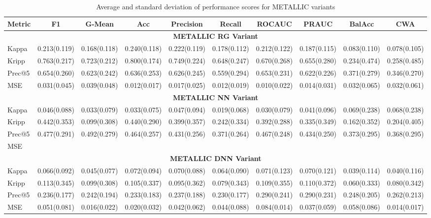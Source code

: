 \documentclass{article}
\begin{document}
\begin{sidewaystable}[htbp]
\centering
\caption{Average and standard deviation of performance scores for METALLIC variants}\label{tab:meanscores}
\small
\begin{tabular}{@{}lccccccccc@{}}
\toprule
\textbf{Metric} & \textbf{F1} & \textbf{G-Mean} & \textbf{Acc} & \textbf{Precision} & \textbf{Recall} & \textbf{ROCAUC} & \textbf{PRAUC} & \textbf{BalAcc} & \textbf{CWA} \\
\midrule
\multicolumn{10}{c}{\textbf{METALLIC \textendash{} RG Variant}} \\
\midrule
Kappa   & 0.213(0.119) & 0.168(0.118) & 0.240(0.118) & 0.222(0.119) & 0.178(0.112) & 0.212(0.122) & 0.187(0.115) & 0.083(0.110) & 0.078(0.105) \\ 
Kripp   & 0.763(0.217) & 0.723(0.212) & 0.800(0.174) & 0.749(0.224) & 0.648(0.247) & 0.670(0.268) & 0.655(0.280) & 0.234(0.474) & 0.258(0.485) \\ 
Prec@5  & 0.654(0.260) & 0.623(0.242) & 0.636(0.253) & 0.626(0.245) & 0.559(0.294) & 0.653(0.231) & 0.622(0.226) & 0.371(0.279) & 0.346(0.270) \\
MSE     & 0.031(0.045) & 0.039(0.048) & 0.012(0.017) & 0.017(0.025) & 0.012(0.019) & 0.010(0.022) & 0.014(0.031) & 0.032(0.065) & 0.032(0.061) \\
\midrule
\multicolumn{10}{c}{\textbf{METALLIC \textendash{} NN Variant}}\\
\midrule
Kappa   & 0.046(0.088) & 0.033(0.079) & 0.033(0.075) & 0.047(0.094) & 0.019(0.068) & 0.030(0.079) & 0.041(0.096) & 0.069(0.238) & 0.068(0.238) \\
Kripp   & 0.442(0.353) & 0.099(0.308) & 0.440(0.290) & 0.399(0.357) & 0.242(0.334) & 0.392(0.288) & 0.335(0.349) & 0.162(0.352) & 0.204(0.405) \\ 
Prec@5  & 0.477(0.291) & 0.492(0.279) & 0.464(0.257) & 0.431(0.256) & 0.371(0.264) & 0.467(0.248) & 0.434(0.250) & 0.373(0.295) & 0.368(0.295) \\
MSE     & \textendash{} & \textendash{} & \textendash{} & \textendash{} & \textendash{} & \textendash{} & \textendash{} & \textendash{} & \textendash{} \\
\midrule
\multicolumn{10}{c}{\textbf{METALLIC \textendash{} DNN Variant}}\\
\midrule
Kappa   & 0.066(0.092) & 0.045(0.077) & 0.072(0.094) & 0.070(0.088) & 0.064(0.090) & 0.071(0.123) & 0.070(0.121) & 0.039(0.114) & 0.040(0.116) \\
Kripp   & 0.113(0.345) & 0.099(0.308) & 0.105(0.337) & 0.095(0.362) & 0.079(0.343) & 0.109(0.355) & 0.110(0.372) & 0.060(0.333) & 0.080(0.342) \\
Prec@5  & 0.236(0.177) & 0.242(0.194) & 0.233(0.183) & 0.237(0.188) & 0.230(0.177) & 0.290(0.241) & 0.290(0.231) & 0.248(0.205) & 0.262(0.213) \\
MSE     & 0.051(0.081) & 0.016(0.022) & 0.020(0.032) & 0.042(0.062) & 0.044(0.088) & 0.084(0.014) & 0.037(0.059) & 0.058(0.086) & 0.014(0.017) \\
\bottomrule
\end{tabular}
\end{sidewaystable}
\end{document}
